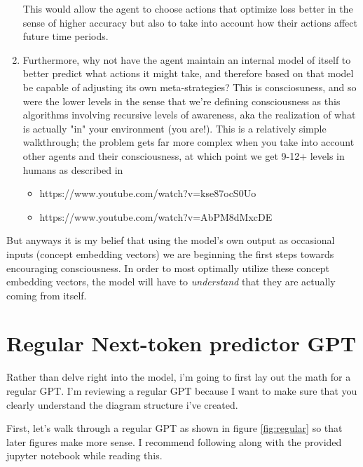 \documentclass{article}
\begin{document}
\begin{enumerate}
    This would allow the agent to choose actions that optimize loss better in the sense of higher accuracy but also to take into account how their actions affect future time periods.
    \item Furthermore, why not have the agent maintain an internal model of itself to better predict what actions it might take, and therefore based on that model be capable of adjusting its own meta-strategies? 
    This is consciosuness, and so were the lower levels in the sense that we're defining consciousness as this algorithms involving recursive levels of awareness, aka the realization of what is actually "in" your environment (you are!).
    This is a relatively simple walkthrough; the problem gets far more complex when you take into account other agents and their consciousness, at which point we get 9-12+ levels in humans as described in 
    \begin{itemize}
        \item https://www.youtube.com/watch?v=kse87ocS0Uo
        \item https://www.youtube.com/watch?v=AbPM8dMxcDE
    \end{itemize}
\end{enumerate}
But anyways it is my belief that using the model's own output as occasional inputs (concept embedding vectors) we are beginning the first steps towards encouraging consciousness.
In order to most optimally utilize these concept embedding vectors, the model will have to \textit{understand} that they are actually coming from itself. 

\section{Regular Next-token predictor GPT}
\label{sec:regular}

Rather than delve right into the model, i'm going to first lay out the math for a regular GPT.
I'm reviewing a regular GPT because I want to make sure that you clearly understand the diagram structure i've created.\par

First, let's walk through a regular GPT as shown in figure \ref{fig:regular} so that later figures make more sense. I recommend following along with the provided jupyter notebook while reading this. \par
\end{document}
